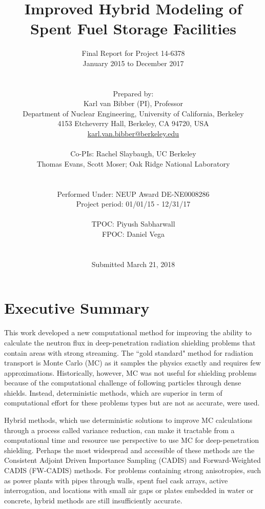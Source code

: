 \documentclass[12pt]{article}
\title{Improved Hybrid Modeling of Spent Fuel Storage Facilities}
\author{ 
  Final Report for Project 14-6378\\
  January 2015 to December 2017\\
  \\
  \\
  Prepared by:\\
  Karl van Bibber (PI), Professor \\
  Department of Nuclear Engineering, University of California, Berkeley \\
  4153 Etcheverry Hall, Berkeley, CA 94720, USA\\
  \href{mailto:karl.van.bibber@berkeley.edu}{karl.van.bibber@berkeley.edu}\\
  \\
 Co-PIs: Rachel Slaybaugh, UC Berkeley\\
  Thomas Evans, Scott Moser; Oak Ridge National Laboratory\\
  \\
  \\
  Performed Under: NEUP Award DE-NE0008286\\
  Project period: 01/01/15 - 12/31/17 \\
  \\ 
  TPOC: Piyush Sabharwall\\
  FPOC: Daniel Vega\\
  \\
  \\
  Submitted March 21, 2018
}
\begin{document}


\maketitle
\clearpage
\tableofcontents
\clearpage

%
\section{Executive Summary}
\label{sect::summary}


This work developed a new computational method for improving the ability to calculate the neutron flux in deep-penetration radiation shielding problems that contain areas with strong streaming. The ``gold standard" method for radiation transport is Monte Carlo (MC) as it samples the physics exactly and requires few approximations. Historically, however, MC was not useful for shielding problems because of the computational challenge of following particles through dense shields. Instead, deterministic methods, which are superior in term of computational effort for these problems types but are not as accurate, were used.

Hybrid methods, which use deterministic solutions to improve MC calculations through a process called variance reduction, can make it tractable from a computational time and resource use perspective to use MC for deep-penetration shielding. Perhaps the most widespread and accessible of these methods are the Consistent Adjoint Driven Importance Sampling (CADIS) and Forward-Weighted CADIS (FW-CADIS) methods. For problems containing strong anisotropies, such as power plants with pipes through walls, spent fuel cask arrays, active interrogation, and locations with small air gaps or plates embedded in water or concrete, hybrid methods are still insufficiently accurate. 
\end{document}
